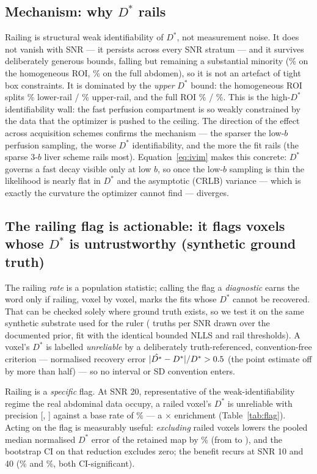 \documentclass[11pt]{article}
\newcommand{\Ds}{D^{*}}
\begin{document}
\subsection{Mechanism: why $\Ds$ rails}
\label{sec:mechanism}

Railing is structural weak identifiability of $\Ds$, not measurement noise. It
does not vanish with SNR --- it persists across every SNR stratum --- and it
survives deliberately generous bounds, falling but remaining a substantial
minority (\HomoWide\% on the homogeneous ROI, \FullWide\% on the full abdomen), so
it is not an artefact of tight box constraints. It is dominated by the
\emph{upper} $\Ds$ bound: the homogeneous ROI splits \HomoLower\% lower-rail /
\HomoUpper\% upper-rail, and the full ROI \FullLower\% / \FullUpper\%. This is the
high-$\Ds$ identifiability wall: the fast perfusion compartment is so weakly
constrained by the data that the optimizer is pushed to the ceiling. The
direction of the effect across acquisition schemes confirms the mechanism --- the
sparser the low-$b$ perfusion sampling, the worse $\Ds$ identifiability, and the
more the fit rails (the sparse 3-$b$ liver scheme rails most). Equation~\eqref{eq:ivim}
makes this concrete: $\Ds$ governs a fast decay visible only at low $b$, so once
the low-$b$ sampling is thin the likelihood is nearly flat in $\Ds$ and the
asymptotic (CRLB) variance --- which is exactly the curvature the optimizer
cannot find --- diverges.

\subsection{The railing flag is actionable: it flags voxels whose $\Ds$ is
untrustworthy (synthetic ground truth)}
\label{sec:flag}

The railing \emph{rate} is a population statistic; calling the flag a
\emph{diagnostic} earns the word only if railing, voxel by voxel, marks the fits
whose $\Ds$ cannot be recovered. That can be checked solely where ground truth
exists, so we test it on the same synthetic substrate used for the ruler
(\flagN{} truths per SNR drawn over the documented prior, fit with the identical
bounded NLLS and rail thresholds). A voxel's $\Ds$ is labelled \emph{unreliable}
by a deliberately truth-referenced, convention-free criterion --- normalised
recovery error $|\hat{\Ds}-\Ds|/\Ds>\flagTau$ (the point estimate off by more
than half) --- so no interval or SD convention enters.

Railing is a \emph{specific} flag. At SNR 20, representative of the
weak-identifiability regime the real abdominal data occupy, a railed voxel's
$\Ds$ is unreliable with precision \flagPrecTwenty{} [\flagPrecTwentyLo,
\flagPrecTwentyHi] against a base rate of \flagBaseTwenty\% --- a
\flagLiftTwenty$\times$ enrichment (Table~\ref{tab:flag}). Acting on the flag is
measurably useful: \emph{excluding} railed voxels lowers the pooled median
normalised $\Ds$ error of the retained map by \flagExclRedTwenty\% (from
\flagErrAllTwenty{} to \flagErrKeptTwenty), and the bootstrap CI on that
reduction excludes zero; the benefit recurs at SNR 10 and 40
(\flagExclRedTen\% and \flagExclRedForty\%, both CI-significant).
\end{document}
